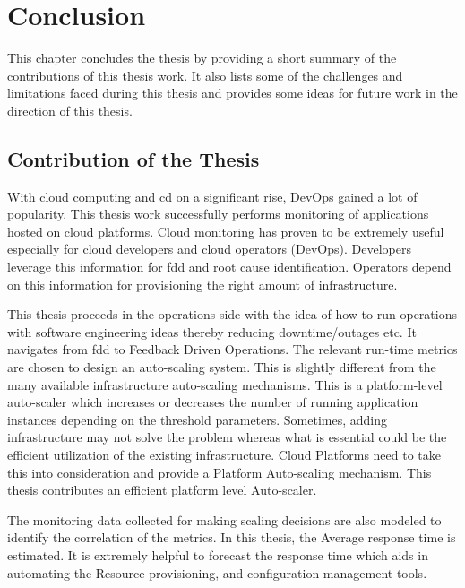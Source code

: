 \documentclass[article,type=msc,colorback,12pt,accentcolor=tud8b,table]{tudthesis}
\begin{document}
\cleardoublepage

 \hfill 
\section{Conclusion}	 
	 \hfill \break

This chapter concludes the thesis by providing a short summary of the contributions of this thesis work. It also lists some of the challenges and limitations faced during this thesis and provides some ideas for future work in the direction of this thesis.
 
\subsection{Contribution of the Thesis}

With cloud computing and \gls{cd} on a significant rise, DevOps gained a lot of popularity. This thesis work successfully performs monitoring of applications hosted on cloud platforms. Cloud monitoring has proven to be extremely useful especially for cloud developers and cloud operators (DevOps). Developers leverage this information for \gls{fdd} and root cause identification. Operators depend on this information for provisioning the right amount of infrastructure.

This thesis proceeds in the operations side with the idea of how to run operations with software engineering ideas thereby reducing downtime/outages etc. It navigates from \gls{fdd} to Feedback Driven Operations. The relevant run-time metrics are chosen to design an auto-scaling system. This is slightly different from the many available infrastructure auto-scaling mechanisms. This is a platform-level auto-scaler which increases or decreases the number of running application instances depending on the threshold parameters. Sometimes, adding infrastructure may not solve the problem whereas what is essential could be the efficient utilization of the existing infrastructure. Cloud Platforms need to take this into consideration and provide a Platform Auto-scaling mechanism. This thesis contributes an efficient platform level Auto-scaler. 

The monitoring data collected for making scaling decisions are also modeled to identify the correlation of the metrics. In this thesis, the Average response time is estimated. It is extremely helpful to forecast the response time which aids in automating the Resource provisioning, and configuration management tools. 
\end{document}
